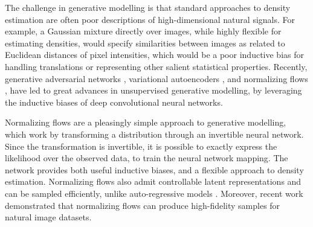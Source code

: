 \documentclass{article}
\begin{document}
The challenge in generative modelling is that standard approaches to density estimation
are often poor descriptions of high-dimensional natural signals. For example, a Gaussian mixture
directly over images, while highly flexible for estimating densities, would specify similarities
between images as related to Euclidean distances of pixel intensities, which would be a poor
inductive bias for handling translations or representing other salient statistical properties. Recently, generative adversarial networks \citep{goodfellow2014generative}, variational autoencoders \citep{kingma2013auto}, and normalizing flows \citep{dinh2014nice}, have 
led to great advances in unsupervised generative modelling, by leveraging the inductive biases of deep convolutional neural networks.

Normalizing flows are a pleasingly simple approach to generative modelling, which work by transforming a distribution through an invertible neural network. Since the transformation is invertible, it is possible to exactly express the likelihood over the observed data, to train the neural network mapping. The network provides both useful inductive biases, and a flexible approach to density estimation. Normalizing flows
also admit controllable latent representations and can be sampled efficiently, unlike auto-regressive models \citep{papamakarios2017masked, oord2016pixel}. 
Moreover, recent work \citep{dinh2016density,kingma2018glow,behrmann2018invertible, chen2019residual, song2019mintnet} demonstrated that normalizing flows can produce high-fidelity samples for natural image datasets.
\end{document}
